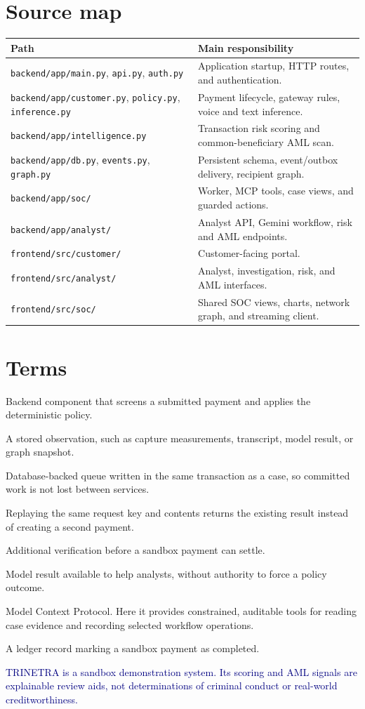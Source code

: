 \documentclass[11pt,a4paper]{article}
\begin{document}
\section{Source map}
\begin{tabularx}{\linewidth}{@{}lX@{}}
\toprule
Path & Main responsibility \\
\midrule
\texttt{backend/app/main.py}, \texttt{api.py}, \texttt{auth.py} & Application startup, HTTP routes, and authentication. \\
\texttt{backend/app/customer.py}, \texttt{policy.py}, \texttt{inference.py} & Payment lifecycle, gateway rules, voice and text inference. \\
\texttt{backend/app/intelligence.py} & Transaction risk scoring and common-beneficiary AML scan. \\
\texttt{backend/app/db.py}, \texttt{events.py}, \texttt{graph.py} & Persistent schema, event/outbox delivery, recipient graph. \\
\texttt{backend/app/soc/} & Worker, MCP tools, case views, and guarded actions. \\
\texttt{backend/app/analyst/} & Analyst API, Gemini workflow, risk and AML endpoints. \\
\texttt{frontend/src/customer/} & Customer-facing portal. \\
\texttt{frontend/src/analyst/} & Analyst, investigation, risk, and AML interfaces. \\
\texttt{frontend/src/soc/} & Shared SOC views, charts, network graph, and streaming client. \\
\bottomrule
\end{tabularx}

\section{Terms}
\begin{description}[style=nextline,leftmargin=28mm]
\item[Gateway] Backend component that screens a submitted payment and applies the deterministic policy.
\item[Evidence] A stored observation, such as capture measurements, transcript, model result, or graph snapshot.
\item[Outbox] Database-backed queue written in the same transaction as a case, so committed work is not lost between services.
\item[Idempotency] Replaying the same request key and contents returns the existing result instead of creating a second payment.
\item[Step-up] Additional verification before a sandbox payment can settle.
\item[Review-only model signal] Model result available to help analysts, without authority to force a policy outcome.
\item[MCP] Model Context Protocol. Here it provides constrained, auditable tools for reading case evidence and recording selected workflow operations.
\item[Settlement] A ledger record marking a sandbox payment as completed.
\end{description}

\vfill
\begin{center}\small\textcolor{navy}{TRINETRA is a sandbox demonstration system. Its scoring and AML signals are explainable review aids, not determinations of criminal conduct or real-world creditworthiness.}\end{center}
\end{document}

